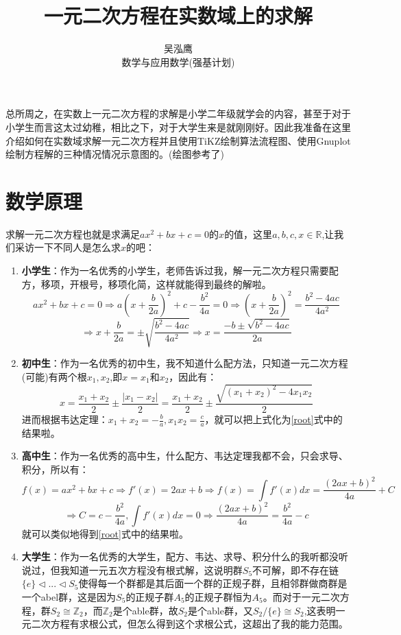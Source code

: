 \documentclass[a4paper]{ctexart}
\author{吴泓鹰\\数学与应用数学(强基计划)\quad3210101890}
\title{\textbf{一元二次方程在实数域上的求解}}
\begin{document}
\maketitle
总所周之，在实数上一元二次方程的求解是小学二年级就学会的内容，甚至于对于小学生而言这太过幼稚，相比之下，对于大学生来是就刚刚好。因此我准备在这里介绍如何在实数域求解一元二次方程并且使用TiKZ绘制算法流程图、使用Gnuplot绘制方程解的三种情况情况示意图的。(绘图参考了\cite{tikz}\cite{gnuplot})

\section{数学原理}	
求解一元二次方程也就是求满足$ax^2+bx+c=0$的$x$的值，这里$a,b,c,x\in\mathbb{R}$,让我们采访一下不同人是怎么求$x$的吧：\cite{xiantong}
\begin{enumerate}
\item  \textbf{小学生}：作为一名优秀的小学生，老师告诉过我，解一元二次方程只需要配方，移项，开根号，移项化简，这样就能得到最终的解啦。
	$$
	ax^2+bx+c=0\Rightarrow a(x+\frac{b}{2a})^2+c-\frac{b^2}{4a}=0
	\Rightarrow (x+\frac{b}{2a})^2=\frac{b^2-4ac}{4a^2}
	$$
	\begin{equation}\label{root}
	\Rightarrow x+\frac{b}{2a}=\pm\sqrt{\frac{b^2-4ac}{4a^2}}
	\Rightarrow x=\frac{-b\pm\sqrt{b^2-4ac}}{2a}
	\end{equation}
\item \textbf{初中生}：作为一名优秀的初中生，我不知道什么配方法，只知道一元二次方程(可能)有两个根$x_1,x_2$,即$x=x_1$和$x_2$，因此有：
	$$
	x=\frac{x_1+x_2}{2}\pm\frac{|x_1-x_2|}{2}=\frac{x_1+x_2}{2}\pm\frac{\sqrt{(x_1+x_2)^2-4x_1 x_2}}{2}
	$$
	进而根据韦达定理：$x_1+x_2=-\frac{b}{a},x_1 x_2=\frac{c}{a}$，就可以把上式化为\ref{root}式中的结果啦。
\item \textbf{高中生}：作为一名优秀的高中生，什么配方、韦达定理我都不会，只会求导、积分，所以有：
	$$
	f(x)=ax^2+bx+c\Rightarrow f'(x)=2ax+b\Rightarrow f(x)=\int f'(x)dx=\frac{(2ax+b)^2}{4a}+C
	$$
	$$
	\Rightarrow C=c-\frac{b^2}{4a},\int f'(x)dx=0\Rightarrow \frac{(2ax+b)^2}{4a}=\frac{b^2}{4a}-c
	$$
	就可以类似地得到\ref{root}式中的结果啦。
\item \textbf{大学生}：作为一名优秀的大学生，配方、韦达、求导、积分什么的我听都没听说过，但我知道一元五次方程没有根式解，这说明群$S_5$不可解，即不存在链$\{e\}\vartriangleleft...\vartriangleleft S_5$使得每一个群都是其后面一个群的正规子群，且相邻群做商群是一个abel群，这是因为$S_5$的正规子群$A_5$的正规子群恒为$A_5$。而对于一元二次方程，群$S_2\cong \mathbb{Z}_2$，而$\mathbb{Z}_2$是个able群，故$S_2$是个able群，又$S_2/\{e\}\cong S_2$,这表明一元二次方程有求根公式，但怎么得到这个求根公式，这超出了我的能力范围。
\end{enumerate}
\end{document}
